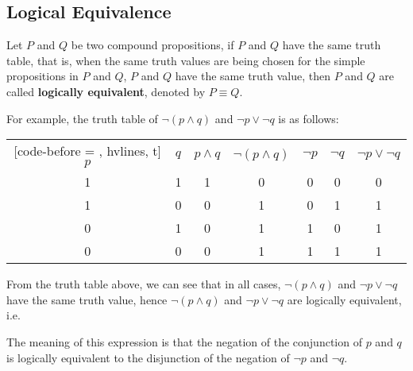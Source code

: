 \documentclass{report}
\newcounter{example}
\begin{document}
\subsection*{Logical Equivalence}

Let $P$ and $Q$ be two compound propositions, if $P$ and $Q$ have the same
truth table, that is, when the same truth values are being chosen for the
simple propositions in $P$ and $Q$, $P$ and $Q$ have the same truth value, then
$P$ and $Q$ are called \textbf{logically equivalent}, denoted by $P \equiv Q$.

For example, the truth table of $\neg (p \land q)$ and $\neg p \lor \neg q$ is
as follows:
\begin{center}
    \begin{NiceTabular}{|c|c|c|c|c|c|c|}[code-before = , hvlines, t]
        $p$ & $q$ & $p \land q$ & $\neg(p \land q)$ & $\neg p$ & $\neg q$ & $\neg p \lor \neg q$ \\
        1   & 1   & 1           & 0                 & 0        & 0        & 0                    \\
        1   & 0   & 0           & 1                 & 0        & 1        & 1                    \\
        0   & 1   & 0           & 1                 & 1        & 0        & 1                    \\
        0   & 0   & 0           & 1                 & 1        & 1        & 1                    \\
    \end{NiceTabular}
\end{center}

From the truth table above, we can see that in all cases, $\neg (p \land q)$
and $\neg p \lor \neg q$ have the same truth value, hence $\neg (p \land q)$
and $\neg p \lor \neg q$ are logically equivalent, i.e. \noindent

\begin{center}
\end{center}

The meaning of this expression is that the negation of the conjunction of $p$
and $q$ is logically equivalent to the disjunction of the negation of $\neg p$
and $\neg q$.
\end{document}
